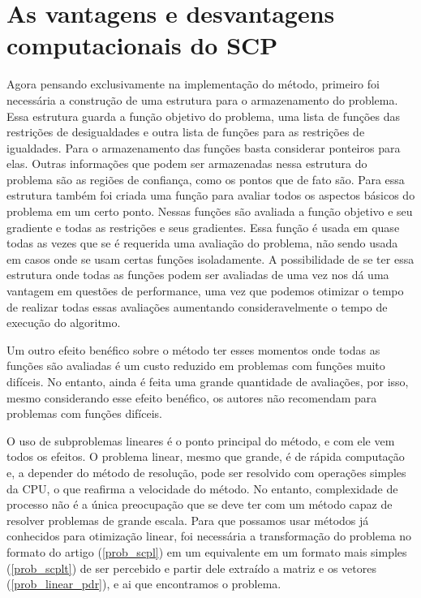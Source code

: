 \section{As vantagens e desvantagens computacionais do SCP}

Agora pensando exclusivamente na implementação do método, primeiro foi necessária
a construção de uma estrutura para o armazenamento do problema. Essa estrutura guarda
a função objetivo do problema, uma lista de funções das restrições de desigualdades e
outra lista de funções para as restrições de igualdades. Para o armazenamento das
funções basta considerar ponteiros para elas. Outras informações que podem ser
armazenadas nessa estrutura do problema são as regiões de confiança, como os
pontos que de fato são. Para essa estrutura também foi criada uma função
para avaliar todos os aspectos básicos do problema em um certo ponto. Nessas
funções são avaliada a função objetivo e seu gradiente e todas as restrições e seus
gradientes. Essa função é usada em quase todas as vezes que se é requerida uma avaliação
do problema, não sendo usada em casos onde se usam certas funções isoladamente. A
possibilidade de se ter essa estrutura onde todas as funções podem ser avaliadas de uma vez
nos dá uma vantagem em questões de performance, uma vez que podemos otimizar o tempo de
realizar todas essas avaliações aumentando consideravelmente o tempo de execução do algoritmo.

Um outro efeito benéfico sobre o método ter esses momentos onde todas as funções são
avaliadas é um custo reduzido em problemas com funções muito difíceis. No entanto, ainda
é feita uma grande quantidade de avaliações, por isso, mesmo considerando esse efeito
benéfico, os autores não recomendam para problemas com funções difíceis.

O uso de subproblemas lineares é o ponto principal do método, e com ele vem todos
os efeitos. O problema linear, mesmo que grande, é de rápida computação e, a depender
do método de resolução, pode ser resolvido com operações simples da CPU, o que reafirma
a velocidade do método. No entanto, complexidade de processo não é a única preocupação
que se deve ter com um método capaz de resolver problemas de grande escala. Para que
possamos usar métodos já conhecidos para otimização linear, foi necessária a transformação
do problema no formato do artigo (\ref{prob_scpl}) em um equivalente em um formato mais
simples (\ref{prob_scplt}) de ser percebido e partir dele extraído a matriz
e os vetores (\ref{prob_linear_pdr}), e ai que encontramos o problema.

